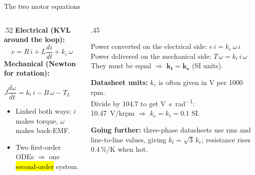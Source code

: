 \documentclass[aspectratio=169,10pt]{beamer}
\newcommand{\gofurther}[1]{{\scriptsize\color{mkGray}\textbf{Going further:} #1\par}}
\begin{document}
\begin{frame}{The two motor equations}
\begin{columns}[T]
\begin{column}{.52\textwidth}
\small
\textbf{Electrical (KVL around the loop):}
\[
v = R\,i + L\frac{di}{dt} + k_e\,\omega
\]
\textbf{Mechanical (Newton for rotation):}
\begin{eqbox}
$J\dfrac{d\omega}{dt} = k_t\,i - B\,\omega - T_L$
\end{eqbox}
\begin{itemize}\setlength\itemsep{1pt}
\item Linked both ways: $i$ makes torque, $\omega$ makes back-EMF.
\item Two first-order ODEs $\Rightarrow$ one \hl{second-order} system.
\end{itemize}
\end{column}
\begin{column}{.45\textwidth}
\begin{keybox}
\small
Power converted on the electrical side: $e\,i=k_e\,\omega\,i$\\
Power delivered on the mechanical side: $T\,\omega=k_t\,i\,\omega$\\
They must be equal $\Rightarrow$ $\bm{k_t=k_e}$ (SI units).
\end{keybox}
\small
\textbf{Datasheet units:} $k_e$ is often given in V per 1000 rpm.\\
Divide by 104.7 to get \si{\volt\second\per\radian}:\\
\SI{10.47}{\volt}/krpm $\Rightarrow$ $k_e=k_t=0.1$ SI.\\[1mm]
\gofurther{three-phase datasheets use rms and line-to-line values, giving $k_t=\sqrt3\,k_e$; resistance rises 0.4\,\%/K when hot.}
\end{column}
\end{columns}
\end{frame}
\end{document}
